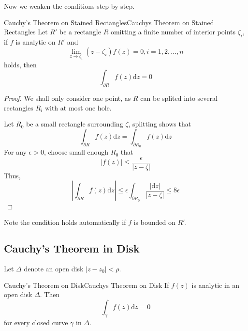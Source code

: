 \documentclass[../main.tex]{subfiles}
\begin{document}
Now we weaken the conditions step by step.

\begin{theorem}{Cauchy's Theorem on Stained Rectangles}{Cauchys Theorem on Stained Rectangles}
Let $R'$ be a rectangle $R$ omitting a finite number of interior points $\zeta_i$, if  $f$ is analytic on $R'$ and 
\begin{equation*}
\lim_{z \to \zeta_i} (z-\zeta_i) f(z) = 0, i=1,2,\ldots,n
\end{equation*}
holds, then
\begin{equation}
	\int_{\partial R} f(z) \mathrm{d} z = 0
\end{equation}
\end{theorem}
\begin{proof}
We shall only consider one point, as $R$ can be splited into several rectangles $R_i$ with at most one hole.

Let $R_0$ be a small rectangle surrounding $\zeta$, splitting shows that
\begin{equation*}
	\int_{\partial R} f(z) \mathrm{d} z = \int_{\partial R_0} f(z) \mathrm{d} z
\end{equation*}
For any $\epsilon>0$, choose small enough $R_0$ that
\begin{equation*}
\left|f(z)\right|\leq \frac{\epsilon}{\left|z-\zeta\right|}
\end{equation*}
Thus,
\begin{equation*}
	\left|\int_{\partial R}f(z) \mathrm{d} z\right| \leq \epsilon \int_{\partial R_0} \frac{\left|\mathrm{d} z\right|}{\left|z-\zeta\right|} \leq 8 \epsilon
\end{equation*}
\end{proof}

Note the condition holds automatically if $f$ is bounded on $R'$.

\subsection{Cauchy's Theorem in Disk}
Let $\Delta$ denote an open disk $\left|z-z_0\right|<\rho$.
\begin{theorem}{Cauchy's Theorem on Disk}{Cauchys Theorem on Disk}
If $f(z)$ is analytic in an open disk $\Delta$. Then
\begin{equation}
\int_{\gamma} f(z) \mathrm{d} z = 0
\end{equation}
for every closed curve $\gamma$ in $\Delta$.
\end{theorem}
\end{document}
